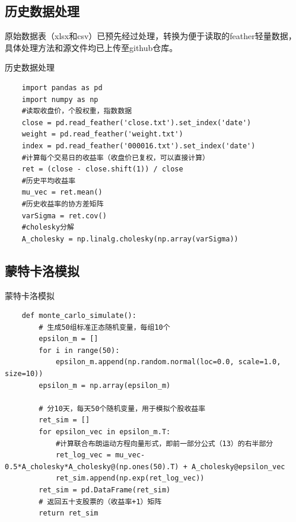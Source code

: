 \documentclass{article}
\begin{document}
    \subsection{历史数据处理}
    \qquad 原始数据表（xlsx和csv）已预先经过处理，转换为便于读取的feather轻量数据，具体处理方法和源文件均已上传至github仓库。
    \begin{listing}[htb]
        \caption{历史数据处理}
        \begin{verbatim}
    import pandas as pd
    import numpy as np
    #读取收盘价，个股权重，指数数据
    close = pd.read_feather('close.txt').set_index('date')
    weight = pd.read_feather('weight.txt')
    index = pd.read_feather('000016.txt').set_index('date')
    #计算每个交易日的收益率（收盘价已复权，可以直接计算）
    ret = (close - close.shift(1)) / close
    #历史平均收益率
    mu_vec = ret.mean()
    #历史收益率的协方差矩阵
    varSigma = ret.cov()
    #cholesky分解
    A_cholesky = np.linalg.cholesky(np.array(varSigma))
    \end{verbatim}
    \end{listing}
    \subsection{蒙特卡洛模拟}
    \begin{listing}[htb]
        \caption{蒙特卡洛模拟}
        \begin{verbatim}
    def monte_carlo_simulate():
        # 生成50组标准正态随机变量，每组10个
        epsilon_m = []
        for i in range(50):
            epsilon_m.append(np.random.normal(loc=0.0, scale=1.0, size=10))
        epsilon_m = np.array(epsilon_m)

        # 分10天，每天50个随机变量，用于模拟个股收益率
        ret_sim = []
        for epsilon_vec in epsilon_m.T:
            #计算联合布朗运动方程向量形式，即前一部分公式（13）的右半部分
            ret_log_vec = mu_vec-0.5*A_cholesky*A_cholesky@(np.ones(50).T) + A_cholesky@epsilon_vec
            ret_sim.append(np.exp(ret_log_vec))
        ret_sim = pd.DataFrame(ret_sim)
        # 返回五十支股票的（收益率+1）矩阵
        return ret_sim
    \end{verbatim}
    \end{listing}
\end{document}

